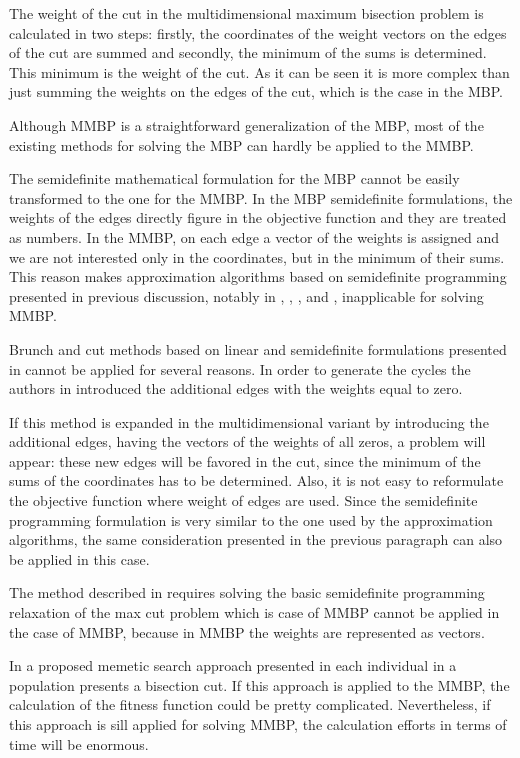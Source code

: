 \documentclass[10pt]{article}
\begin{document}
The weight of the cut in the multidimensional maximum bisection problem is calculated in two steps: firstly, the coordinates of the weight vectors on the edges of the cut are summed and secondly, the minimum of the sums is determined. This minimum is the weight of the cut. As it can be seen it is more complex than just summing the weights on the edges of the cut, which is the case in the MBP. 


Although MMBP is a straightforward generalization of the MBP, most of the existing methods for solving the MBP can hardly be applied to the MMBP. 




The semidefinite mathematical  formulation for the MBP cannot be easily transformed to the one for the MMBP. In the MBP semidefinite formulations, the weights of the edges directly  figure in the objective function and they are treated as numbers. In the MMBP,  on each edge a vector of the weights is assigned and we are not interested only in the coordinates, but in the minimum of their sums. This reason makes approximation algorithms based on semidefinite programming presented in previous discussion, notably   
in \cite{frieze}, \cite{goemans},
\cite{zwick}, \cite{karish} and \cite{ye}, inapplicable for solving MMBP. 

Brunch and cut methods based on linear and semidefinite formulations presented in \cite{armb} cannot be applied for several reasons. 
In order to generate the cycles the authors in \cite{armb} introduced the additional edges with the weights equal to zero. 


If this method is expanded in the multidimensional variant by introducing the additional edges, having the vectors of the weights of all zeros, a problem will appear: these new edges will be favored in the cut, since the minimum of the sums of the coordinates has to be determined. Also, it is not easy to reformulate the objective function where weight of edges are used.
Since the semidefinite programming formulation is very similar to the one used by the approximation algorithms, the same consideration presented in the previous paragraph can  also be applied in this case.


The method described in \cite{rendl} requires solving the basic semidefinite programming relaxation of the max cut problem
which is case of MMBP cannot be applied  in the case of MMBP, because in MMBP the weights are represented as vectors.


In a proposed memetic search approach presented in \cite{wu} each individual in a population presents a bisection cut. 
If this approach is applied to the MMBP, the calculation of the fitness function could be pretty complicated. Nevertheless, if this approach is sill applied for solving MMBP, the calculation efforts in terms of time will be enormous. 
\end{document}
